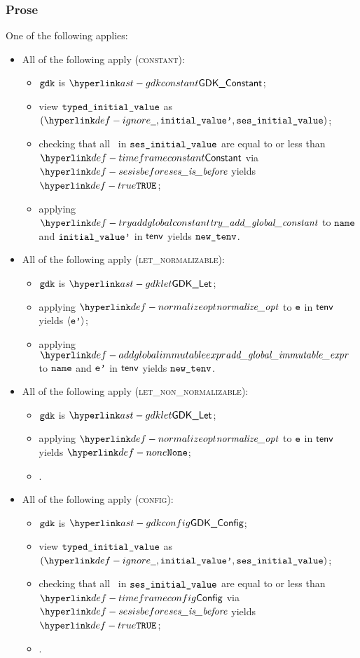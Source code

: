 \subsubsection{Prose}
One of the following applies:
\begin{itemize}
  \item All of the following apply (\textsc{constant}):
  \begin{itemize}
    \item $\texttt{gdk}$ is $\GDKConstant$;
    \item view $\texttt{typed\_initial\_value}$ as $(\Ignore, \initialvaluep, \vsesinitialvalue)$;
    \item checking that all \timeframesterm\ in $\texttt{ses\_initial\_value}$ are equal to or less than
          $\timeframeconstant$ via $\sesisbefore$ yields $\True$\ProseOrTypeError;
    \item applying $\tryaddglobalconstant$ to $\texttt{name}$ and $\texttt{initial\_value'}$ in $\tenv$ yields $\newtenv$.
  \end{itemize}

  \item All of the following apply (\textsc{let\_normalizable}):
  \begin{itemize}
    \item $\texttt{gdk}$ is $\GDKLet$;
    \item applying $\normalizeopt$ to $\texttt{e}$ in $\tenv$ yields $\langle\texttt{e'}\rangle$\ProseOrTypeError;
    \item applying $\addglobalimmutableexpr$ to $\texttt{name}$ and $\texttt{e'}$ in $\tenv$ yields $\newtenv$.
  \end{itemize}

  \item All of the following apply (\textsc{let\_non\_normalizable}):
  \begin{itemize}
    \item $\texttt{gdk}$ is $\GDKLet$;
    \item applying $\normalizeopt$ to $\texttt{e}$ in $\tenv$ yields $\None$\ProseOrTypeError;
    \item \Proseeqdef{$\newtenv$}{$\tenv$}.
  \end{itemize}

  \item All of the following apply (\textsc{config}):
  \begin{itemize}
    \item $\texttt{gdk}$ is $\GDKConfig$;
    \item view $\texttt{typed\_initial\_value}$ as $(\Ignore, \initialvaluep, \vsesinitialvalue)$;
    \item checking that all \timeframesterm\ in $\texttt{ses\_initial\_value}$ are equal to or less than
          $\timeframeconfig$ via $\sesisbefore$ yields $\True$\ProseOrTypeError;
    \item \Proseeqdef{$\newtenv$}{$\tenv$}.
  \end{itemize}


\end{itemize}
